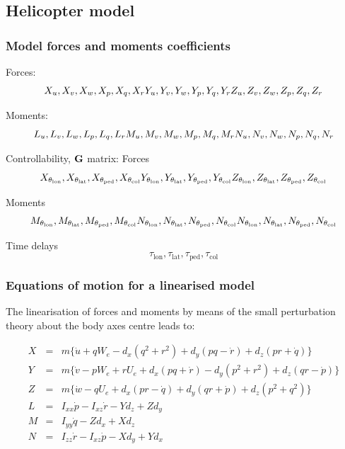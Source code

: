 \subsection{Helicopter model}

  \subsubsection{Model forces and moments coefficients}
    Forces: 
    $$
    X_u, X_v, X_w, X_p, X_q, X_r \\
    Y_u, Y_v, Y_w, Y_p, Y_q, Y_r \\
    Z_u, Z_v, Z_w, Z_p, Z_q, Z_r
    $$

    Moments:
    $$
    L_u, L_v, L_w, L_p, L_q, L_r \\
    M_u, M_v, M_w, M_p, M_q, M_r \\
    N_u, N_v, N_w, N_p, N_q, N_r
    $$

    Controllability, $\mathrm{\textbf{G}}$ matrix:
    Forces
    $$
    X_{\theta_{\mathrm{lon}}}, X_{\theta_{\mathrm{lat}}}, X_{\theta_{\mathrm{ped}}}, X_{\theta_{\mathrm{col}}} \\
    Y_{\theta_{\mathrm{lon}}}, Y_{\theta_{\mathrm{lat}}}, Y_{\theta_{\mathrm{ped}}}, Y_{\theta_{\mathrm{col}}} \\
    Z_{\theta_{\mathrm{lon}}}, Z_{\theta_{\mathrm{lat}}}, Z_{\theta_{\mathrm{ped}}}, Z_{\theta_{\mathrm{col}}}
    $$

    Moments
    $$
    M_{\theta_{\mathrm{lon}}}, M_{\theta_{\mathrm{lat}}}, M_{\theta_{\mathrm{ped}}}, M_{\theta_{\mathrm{col}}} \\
    N_{\theta_{\mathrm{lon}}}, N_{\theta_{\mathrm{lat}}}, N_{\theta_{\mathrm{ped}}}, N_{\theta_{\mathrm{col}}} \\
    N_{\theta_{\mathrm{lon}}}, N_{\theta_{\mathrm{lat}}}, N_{\theta_{\mathrm{ped}}}, N_{\theta_{\mathrm{col}}}
    $$

    Time delays
    $$
    \tau_{\mathrm{lon}}, \tau_{\mathrm{lat}}, \tau_{\mathrm{ped}}, \tau_{\mathrm{col}}
    $$

  \subsubsection{Equations of motion for a linearised model}

    The linearisation of forces and moments by means of the small perturbation theory about the body axes centre leads to:

    \begin{eqnarray}
      X &=& m \{\dot{u} + q W_e -d_x(q^2 + r^2) + d_y(pq - \dot{r}) + d_z(pr + \dot{q}) \} \\[6pt]
      Y &=& m \{ \dot{v} - p W_e + r U_e + d_x(pq + \dot{r}) - d_y(p^2 + r^2) + d_z(qr - \dot{p}) \} \\[6pt]
      Z &=& m \{\dot{w} - q U_e + d_x(pr - \dot{q}) + d_y(qr + \dot{p}) + d_z(p^2 + q^2) \} \\[6pt]
      L &=& I_{xx} \dot{p} - I_{xz}\dot{r} - Y d_z + Z d_y \\[6pt]
      M &=& I_{yy} \dot{q} - Z d_x + X d_z \\[6pt]
      N &=& I_{zz} \dot{r} - I_{xz} \dot{p} - X d_y +Y d_x
    \end{eqnarray}

